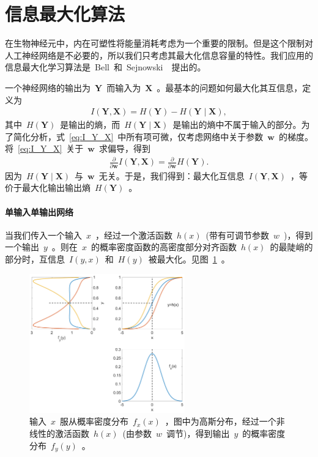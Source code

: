 \documentclass[UTF8,a4paper,12pt]{ctexart}
\numberwithin{equation}{section}
\numberwithin{figure}{section}
\numberwithin{table}{section}
\renewcommand{\bold}[1]{~$\bm{#1}$~}
\begin{document}
\section{信息最大化算法} \label{section2}
在生物神经元中，内在可塑性将能量消耗考虑为一个重要的限制。但是这个限制对人工神经网络是不必要的，所以我们只考虑其最大化信息容量的特性。我们应用的信息最大化学习算法是~Bell~和~Sejnowski~\cite{bell1995information}~提出的。

一个神经网络的输出为\bold{Y}而输入为\bold{X}。最基本的问题如何最大化其互信息，定义为
\begin{align}
I(\bm{Y},\bm{X})=H(\bm{Y})-H(\bm{Y} \mid \bm{X}), \label{eq:I_Y_X}
\end{align}
其中~$H(\bm{Y})$~是输出的熵，而~$H(\bm{Y} \mid \bm{X})$~是输出的熵中不属于输入的部分。为了简化分析，式~\eqref{eq:I_Y_X}~中所有项可微，仅考虑网络中关于参数\bold{w}的梯度。将~\eqref{eq:I_Y_X}~关于\bold{w}求偏导，得到
\begin{align}
\frac{\partial}{\partial \bm{w}} I(\bm{Y},\bm{X})=\frac{\partial}{\partial \bm{w}} H(\bm{Y}).
\end{align}
因为~$H(\bm{Y} \mid \bm{X})$~与\bold{w}无关。于是，我们得到：最大化互信息~$I(\bm{Y},\bm{X})$~，等价于最大化输出输出熵~$H(\bm{Y})$~。

\paragraph{单输入单输出网络} 当我们传入一个输入~$x$~，经过一个激活函数~$h(x)$~(带有可调节参数~$w$~)，得到一个输出~$y$~。则在~$x$~的概率密度函数的高密度部分对齐函数~$h(x)$~的最陡峭的部分时，互信息~$I(y,x)$~和~$H(y)$~被最大化。见图~\ref{fig:maximization}~。
\begin{figure}[htbp]
	\centering
	\includegraphics[width=0.6\textwidth]{maximization.pdf}
	\caption{输入~$x$~服从概率密度分布~$f_x(x)$~，图中为高斯分布，经过一个非线性的激活函数~$h(x)$~(由参数~$w$~调节)，得到输出~$y$~的概率密度分布~$f_y(y)$~。}\label{fig:maximization}
\end{figure}
\end{document}
